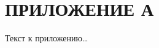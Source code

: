 \documentclass[../main]{subfiles}
\begin{document}
\newpage
{}
\label{sec:appendix1}
\section*{ПРИЛОЖЕНИЕ А}
Текст к приложению\dots
\end{document}
